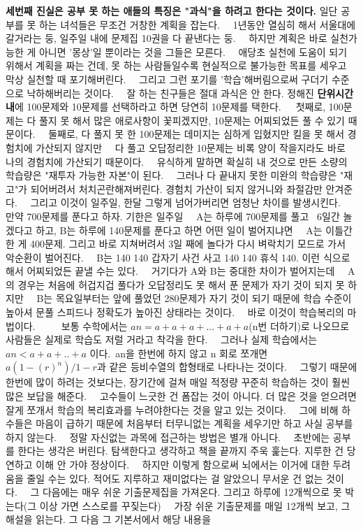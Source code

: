 \textbf{세번째 진실은 공부 못 하는 애들의 특징은 "과식"을 하려고 한다는 것이다.}
일단 공부를 못 하는 녀석들은 무조건 거창한 계획을 잡는다.   1년동안 열심히 해서 서울대에 갈거라는 둥, 일주일 내에 문제집 10권을 다 끝낸다는 둥.   하지만 계획은 바로 실천가능한 게 아니면 '몽상'일 뿐이라는 것을 그들은 모른다.   애당초 실천에 도움이 되기 위해서 계획을 짜는 건데, 못 하는 사람들일수록 현실적으로 불가능한 목표를 세우고 막상 실천할 때 포기해버린다.   그리고 그런 포기를 '학습'해버림으로써 구더기 수준으로 낙하해버리는 것이다.   잘 하는 친구들은 절대 과식은 안 한다. 정해진 \textbf{단위시간 내}에 100문제와 10문제를 선택하라고 하면 당연히 10문제를 택한다.   첫째로, 100문제는 다 풀지 못 해서 많은 애로사항이 꽃피겠지만, 10문제는 어찌되었든 풀 수 있기 때문이다.   둘째로, 다 풀지 못 한 100문제는 데미지는 심하게 입혔지만 킬을 못 해서 경험치에 가산되지 않지만   다 풀고 오답정리한 10문제는 비록 양이 작을지라도 바로 나의 경험치에 가산되기 때문이다.   유식하게 말하면 확실히 내 것으로 만든 소량의 학습량은 "재투자 가능한 자본"이 된다.   그러나 다 끝내지 못한 미완의 학습량은 "재고"가 되어버려서 처치곤란해져버린다. 경험치 가산이 되지 않거니와 좌절감만 안겨준다.   그리고 이것이 일주일, 한달 그렇게 넘어가버리면 엄청난 차이를 발생시킨다.   만약 700문제를 푼다고 하자. 기한은 일주일   A는 하루에 700문제를 풀고  6일간 놀겠다고 하고, B는 하루에 140문제를 푼다고 하면 어떤 일이 벌어지냐면   A는 이틀간 한 게 400문제. 그리고 바로 지쳐버려서 3일 째에 놀다가 다시 벼락치기 모드로 가서 악순환이 벌어진다.   B는 140 140 갑자기 사건 사고 140 140 휴식 140. 이런 식으로 해서 어찌되었든 끝낼 수는 있다.   거기다가 A와 B는 중대한 차이가 벌어지는데   A의 경우는 처음에 허겁지겁 풀다가 오답정리도 못 해서 푼 문제가 자기 것이 되지 못 하지만   B는 목요일부터는 앞에 풀었던 280문제가 자기 것이 되기 때문에 학습 수준이 높아셔 문풀 스피드나 정확도가 높아진 상태라는 것이다.   바로 이것이 학습복리의 마법이다.      보통 수학에서는 $an=a+a+a+...+a+a$(n번 더하기)로 나오므로 사람들은 실제로 학습도 저럴 거라고 착각을 한다.   그러나 실제 학습에서는 $an<a+a+..+a$ 이다. an을 한번에 하지 않고 n 회로 쪼개면 $a(1-(r)^n)/1-r $과 같은 등비수열의 합형태로 나타나는 것이다.   그렇기 때문에 한번에 많이 하려는 것보다는, 장기간에 걸쳐 매일 적정량 꾸준히 학습하는 것이 훨씬 많은 보답을 해준다.   고수들이 느긋한 건 폼잡는 것이 아니다. 더 많은 것을 얻으려면 잘게 쪼개서 학습의 복리효과를 누려야한다는 것을 알고 있는 것이다.   그에 비해 하수들은 마음이 급하기 때문에 처음부터 터무니없는 계획을 세우기만 하고 사실 공부를 하지 않는다.   정말 자신없는 과목에 접근하는 방법은 별개 아니다.   초반에는 공부를 한다는 생각은 버린다. 탐색한다고 생각하고 책을 끝까지 주욱 훑는다. 지루한 건 당연하고 이해 안 가야 정상이다.   하지만 이렇게 함으로써 뇌에서는 이거에 대한 두려움을 줄일 수는 있다. 적어도 지루하고 재미없다는 걸 알았으니 무서운 건 없는 것이다.   그 다음에는 매우 쉬운 기출문제집을 가져온다. 그리고 하루에 12개씩으로 못 박는다(그 이상 가면 스스로를 꾸짖는다)   가장 쉬운 기출문제를 매일 12개씩 보고, 그 해설을 읽는다. 그 다음 그 기본서에서 해당 내용을 